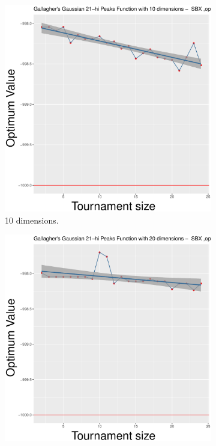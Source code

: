 \begin{figure}[t]
	\begin{subfigure}[b]{0.33\textwidth}
		\centering
		\includegraphics[width=\textwidth]{img/SBX-10D/multimodal_sbx_22_dim_10.pdf}
		\caption{10 dimensions.}
	\end{subfigure}
	\begin{subfigure}[b]{0.33\textwidth}
		\centering
			\includegraphics[width=\textwidth]{img/SBX-20D/multimodal_sbx_22_dim_20.pdf}

\end{subfigure}
\end{figure}
